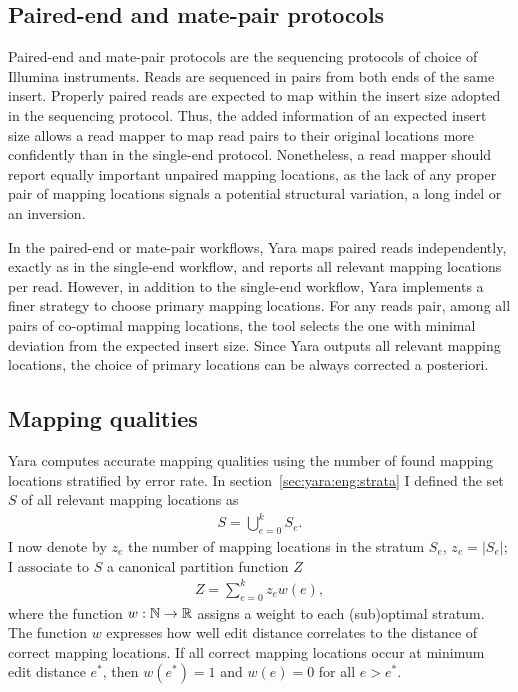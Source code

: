 

\subsection{Paired-end and mate-pair protocols}
\label{sec:yara:eng:pairs}
Paired-end and mate-pair protocols are the sequencing protocols of choice of Illumina instruments.
Reads are sequenced in pairs from both ends of the same insert.
Properly paired reads are expected to map within the insert size adopted in the sequencing protocol.
Thus, the added information of an expected insert size allows a read mapper to map read pairs to their original locations more confidently than in the single-end protocol.
Nonetheless, a read mapper should report equally important unpaired mapping locations, as the lack of any proper pair of mapping locations signals a potential structural variation, \eg a long indel or an inversion.

In the paired-end or mate-pair workflows, Yara maps paired reads independently, exactly as in the single-end workflow, and reports all relevant mapping locations per read.
However, in addition to the single-end workflow, Yara implements a finer strategy to choose primary mapping locations.
For any reads pair, among all pairs of co-optimal mapping locations, the tool selects the one with minimal deviation from the expected insert size.
Since Yara outputs all relevant mapping locations, the choice of primary locations can be always corrected a posteriori.

\subsection{Mapping qualities}
\label{sec:yara:eng:qualities}
Yara computes accurate mapping qualities using the number of found mapping locations stratified by error rate.
In section~\ref{sec:yara:eng:strata} I defined the set $S$ of all relevant mapping locations as
\begin{eqnarray}
S = \bigcup_{e=0}^{k} S_e.
\end{eqnarray}
I now denote by $z_e$ the number of mapping locations in the stratum $S_e$, \ie $z_e=|S_e|$;
I associate to $S$ a canonical partition function $Z$
\begin{eqnarray}
\label{eq:yara:mqual:partition}
Z = \sum_{e=0}^{k} z_e w(e),
\end{eqnarray}
where the function $w : \mathbb {N} \rightarrow \mathbb {R}$ assigns a weight to each (sub)optimal stratum.
The function $w$ expresses how well edit distance correlates to the distance of correct mapping locations.
If all correct mapping locations occur at minimum edit distance $e^*$, then $w(e^*) = 1$ and $w(e) = 0$ for all $e > e^*$.

